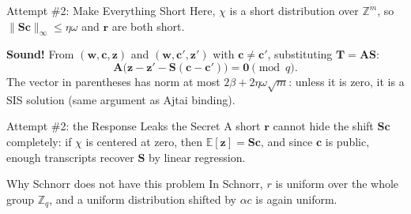 \documentclass{zkdl-presentation-template}
\begin{document}
\begin{frame}{Attempt \#2: Make Everything Short}
        {\small Here, $\chi$ is a short distribution over $\mathbb{Z}^m$, so $\|\mathbf{S}\mathbf{c}\|_{\infty} \leq \eta\omega$ and $\mathbf{r}$ are both short.}
        \pause

        \textbf{Sound!} From $(\mathbf{w},\mathbf{c},\mathbf{z})$ and $(\mathbf{w},\mathbf{c}',\mathbf{z}')$ with $\mathbf{c} \neq \mathbf{c}'$, substituting $\mathbf{T} = \mathbf{A}\mathbf{S}$:
        \begin{equation*}
            \mathbf{A}\bigl(\mathbf{z}-\mathbf{z}' - \mathbf{S}(\mathbf{c}-\mathbf{c}')\bigr) = \mathbf{0} \pmod q.
        \end{equation*}
        The vector in parentheses has norm at most $2\beta + 2\eta\omega\sqrt{m}$: unless it is zero, it is a SIS solution (same argument as Ajtai binding).
    \end{frame}

    \begin{frame}{Attempt \#2: the Response Leaks the Secret}
        A short $\mathbf{r}$ cannot hide the shift $\mathbf{S}\mathbf{c}$ completely: if $\chi$ is centered at zero, then $\mathbb{E}[\mathbf{z}] = \mathbf{S}\mathbf{c}$, and since $\mathbf{c}$ is public, enough transcripts recover $\mathbf{S}$ by linear regression.

        \begin{center}
        \end{center}
        \pause

        \begin{alertblock}{Why Schnorr does not have this problem}
            In Schnorr, $r$ is uniform over the whole group $\mathbb{Z}_q$, and a uniform distribution shifted by $\alpha c$ is again uniform.
        \end{alertblock}
    \end{frame}
\end{document}

